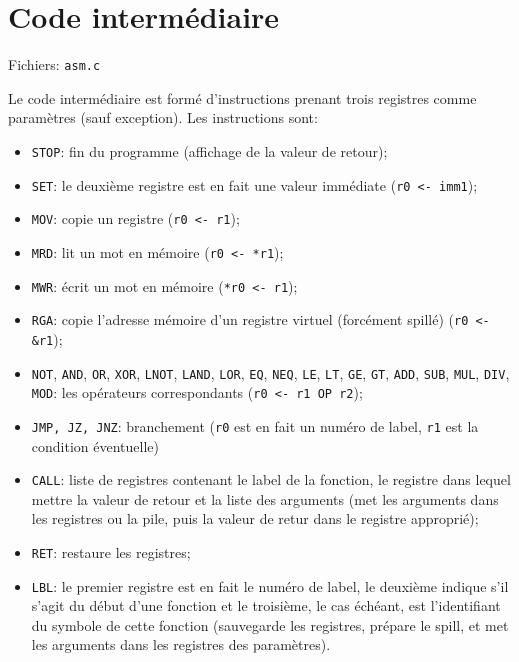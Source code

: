 \documentclass{article}
\begin{document}
	\section{Code intermédiaire}
		\par Fichiers: \verb#asm.c#
		\par Le code intermédiaire est formé d'instructions prenant trois registres comme paramètres (sauf exception). Les instructions sont:
		\begin{itemize}
			\item \verb#STOP#: fin du programme (affichage de la valeur de retour);
			\item \verb#SET#: le deuxième registre est en fait une valeur immédiate (\verb#r0 <- imm1#);
			\item \verb#MOV#: copie un registre (\verb#r0 <- r1#);
			\item \verb#MRD#: lit un mot en mémoire (\verb#r0 <- *r1#);
			\item \verb#MWR#: écrit un mot en mémoire (\verb#*r0 <- r1#);
			\item \verb#RGA#: copie l'adresse mémoire d'un registre virtuel (forcément spillé) (\verb#r0 <- &r1#);
			\item \verb#NOT#, \verb#AND#, \verb#OR#, \verb#XOR#, \verb#LNOT#, \verb#LAND#, \verb#LOR#, \verb#EQ#, \verb#NEQ#, \verb#LE#, \verb#LT#, \verb#GE#, \verb#GT#, \verb#ADD#, \verb#SUB#, \verb#MUL#, \verb#DIV#, \verb#MOD#: les opérateurs correspondants (\verb#r0 <- r1 OP r2#);
			\item \verb#JMP, JZ, JNZ#: branchement (\verb#r0# est en fait un numéro de label, \verb#r1# est la condition éventuelle)
			\item \verb#CALL#: liste de registres contenant le label de la fonction, le registre dans lequel mettre la valeur de retour et la liste des arguments (met les arguments dans les registres ou la pile, puis la valeur de retur dans le registre approprié);
			\item \verb#RET#: restaure les registres;
			\item \verb#LBL#: le premier registre est en fait le numéro de label, le deuxième indique s'il s'agit du début d'une fonction et le troisième, le cas échéant, est l'identifiant du symbole de cette fonction (sauvegarde les registres, prépare le spill, et met les arguments dans les registres des paramètres).
		\end{itemize}
\end{document}
